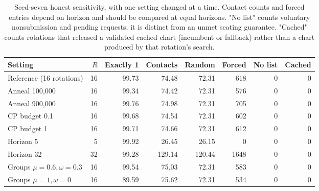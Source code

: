 \begin{table}[tb]\centering\small
\caption{Seed-seven honest sensitivity, with one setting changed at a time. Contact counts and forced entries depend on horizon and should be compared at equal horizons. "No list" counts voluntary nonsubmission and pending requests; it is distinct from an unmet seating guarantee. "Cached" counts rotations that released a validated cached chart (incumbent or fallback) rather than a chart produced by that rotation's search.}\label{tab:sensitivity}
\begin{tabular}{@{}lrrrrrrr@{}}\toprule
Setting & $R$ & Exactly 1 & Contacts & Random & Forced & No list & Cached \\ \midrule
Reference (16 rotations) & 16 & 99.73 & 74.48 & 72.31 & 618 & 0 & 0 \\
Anneal 100,000 & 16 & 99.34 & 74.42 & 72.31 & 576 & 0 & 0 \\
Anneal 900,000 & 16 & 99.76 & 74.98 & 72.31 & 705 & 0 & 0 \\
CP budget 0.1 & 16 & 99.68 & 74.54 & 72.31 & 602 & 0 & 0 \\
CP budget 1 & 16 & 99.71 & 74.66 & 72.31 & 612 & 0 & 0 \\
Horizon 5 & 5 & 99.92 & 26.45 & 26.15 & 0 & 0 & 0 \\
Horizon 32 & 32 & 99.28 & 129.14 & 120.44 & 1648 & 0 & 0 \\
Groups $\mu=0.6,\omega=0.3$ & 16 & 99.54 & 75.03 & 72.31 & 583 & 0 & 0 \\
Groups $\mu=1,\omega=0$ & 16 & 89.59 & 75.62 & 72.31 & 534 & 0 & 0 \\
\bottomrule\end{tabular}\end{table}
